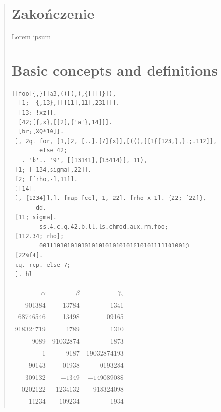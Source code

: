 \documentclass{pracamgr}
\begin{document}
\begin{quote}


 \chapter*{Zakończenie}\label{r:ending}
Lorem ipsum



\appendix

\chapter{Basic concepts and definitions}

\begin{verbatim}
[[foo]{,}[[a3,(([(,),{[[]]}]),
  [1; [{,13},[[[11],11],231]]].
  [13;[!xz]].
  [42;[{,x},[[2],{'a'},14]]].
  [br;[XQ*10]].
 ), 2q, for, [1,]2, [..].[7]{x}],[(((,[[1{{123,},},;.112]],
        else 42;
   . 'b'.. '9', [[13141],{13414}], 11),
 [1; [[134,sigma],22]].
 [2; [[rho,-],11]].
 )[14].
 ), {1234}],]. [map [cc], 1, 22]. [rho x 1]. {22; [22]},
       dd.
 [11; sigma].
        ss.4.c.q.42.b.ll.ls.chmod.aux.rm.foo;
 [112.34; rho];
        001110101010101010101010101010101111101001@
 [22%f4].
 cq. rep. else 7;
 ]. hlt
\end{verbatim}
 
 


\begin{center}
  \begin{tabular}{rrr}
    $\alpha$ & $\beta$ & $\gamma_7$ \\
    901384 & 13784 & 1341\\
    68746546 & 13498& 09165\\
    918324719& 1789 & 1310 \\
    9089 & 91032874& 1873 \\
    1 & 9187 & 19032874193 \\
    90143 & 01938 & 0193284 \\
    309132 & $-1349$ & $-149089088$ \\
    0202122 & 1234132 & 918324098 \\
    11234 & $-109234$ & 1934 \\
  \end{tabular}
\end{center}



\end{quote}
\end{document}
